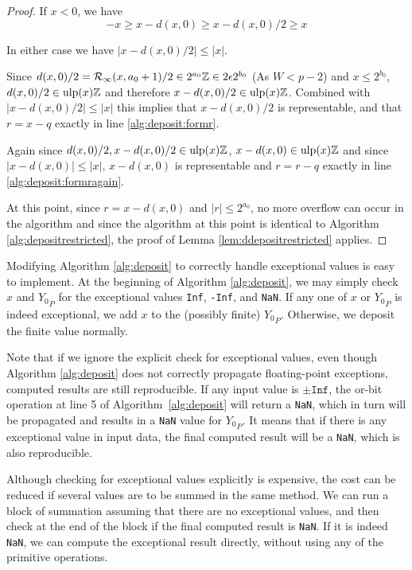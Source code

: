 \begin{proof}
         If $x < 0$, we have
        \begin{equation*}
          -x \geq x - d(x, 0) \geq x - d(x, 0)/2 \geq x
        \end{equation*}

        In either case we have $|x - d(x, 0)/2| \leq |x|$.

        Since
        \(
            d(x, 0)/2 = \mathcal{R}_\text{$\infty$}(x, a_0 + 1)/2 \in 2^{a_0}\mathbb{Z} \in 2\epsilon 2^{b_0}
        \)
        (As $W < p - 2$) and $x \leq 2^{b_0}$, $d(x, 0)/2 \in \text{ulp}(x)\mathbb{Z}$ and
        therefore $x - d(x, 0)/2 \in \text{ulp}(x)\mathbb{Z}$. Combined with $|x - d(x, 0)/2| \leq |x|$
        this implies that $x - d(x, 0)/2$ is representable,
        and that $r=x-q$ exactly in line \ref{alg:deposit:formr}.

        Again since $d(x, 0)/2, x - d(x, 0)/2 \in \text{ulp}(x)\mathbb{Z}$, $x - d(x, 0) \in
        \text{ulp}(x)\mathbb{Z}$ and since $|x - d(x, 0)| \leq |x|$, $x - d(x, 0)$ is
        representable and $r=r-q$ exactly in line \ref{alg:deposit:formragain}.

        At this point, since $r = x - d(x, 0)$ and $|r| \leq 2^{a_0}$, no more
        overflow can occur in the algorithm and since the algorithm at this
        point is identical to Algorithm \ref{alg:depositrestricted}, the proof
        of Lemma \ref{lem:ddepositrestricted} applies.
      \end{proof}

      Modifying Algorithm \ref{alg:deposit} to correctly handle exceptional
      values is easy to implement. At the beginning of Algorithm
      \ref{alg:deposit}, we may simply check $x$ and ${Y_0}_P$ for the
      exceptional values \texttt{Inf}, \texttt{-Inf}, and \texttt{NaN}. If any
      one of $x$ or ${Y_0}_P$ is indeed exceptional, we add $x$ to the
      (possibly finite) ${Y_0}_P$. Otherwise, we deposit the finite value
      normally.

      Note that if we ignore the explicit check for exceptional values,
      even though Algorithm \ref{alg:deposit} does not correctly propagate 
      floating-point exceptions, computed results are still reproducible.
      If any input value is $\pm \texttt{Inf}$, the or-bit operation
      at line 5 of Algorithm~\ref{alg:deposit} will return a \texttt{NaN},
      which in turn will be propagated and results in a \texttt{NaN} value for ${Y_0}_P$.
      It means that if there is any exceptional value in input data,
      the final computed result will be a \texttt{NaN}, which is also reproducible.

      Although checking for exceptional values explicitly is expensive, the
      cost can be reduced if several values are to be summed in the same method.
      We can run a block of summation assuming that there are no exceptional values, and then check at the end of the block if the final computed result is \texttt{NaN}. If it is indeed \texttt{NaN}, we can compute the exceptional result directly, without using any of the primitive operations.

